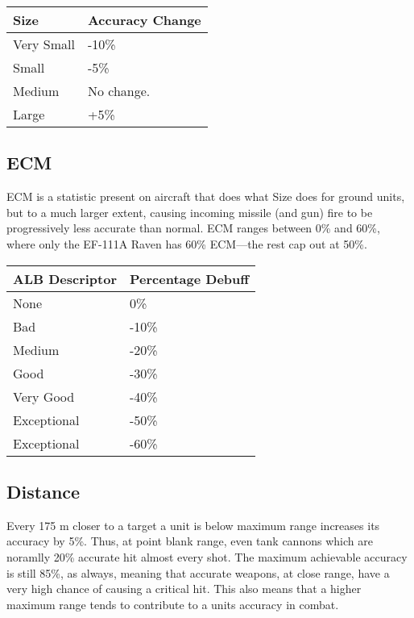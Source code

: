 \documentclass{article}
\begin{document}
\begin{center}
    \begin{tabular}{ | l | p{3cm} | }
    \hline
    Size & Accuracy Change \\ \hline
    Very Small & -10\% \\
    Small & -5\% \\ 
    Medium & No change. \\ 
    Large & +5\% \\ \hline
    \end{tabular}
\end{center}

\subsection{ECM}

ECM is a statistic present on aircraft that does what Size does for ground
units, but to a much larger extent, causing incoming missile (and gun) fire to
be progressively less accurate than normal. ECM ranges between 0\% and 60\%,
where only the EF-111A Raven has 60\% ECM---the rest cap out at 50\%.

\begin{center}
    \begin{tabular}{ | l | p{3cm} | }
    \hline
    ALB Descriptor & Percentage Debuff \\ \hline
    None & 0\% \\
    Bad & -10\% \\ 
    Medium & -20\% \\ 
    Good & -30\% \\ 
    Very Good & -40\% \\
    Exceptional & -50\% \\
    Exceptional & -60\% \\
    \hline
    \end{tabular}
\end{center}

\subsection{Distance}

Every 175 m closer to a target a unit is below maximum range increases its
accuracy by 5\%. Thus, at point blank range, even tank cannons which are
noramlly 20\% accurate hit almost every shot. The maximum achievable accuracy is
still 85\%, as always, meaning that accurate weapons, at close range, have a
very high chance of causing a critical hit. This also means that a higher
maximum range tends to contribute to a units accuracy in combat.
\end{document}
